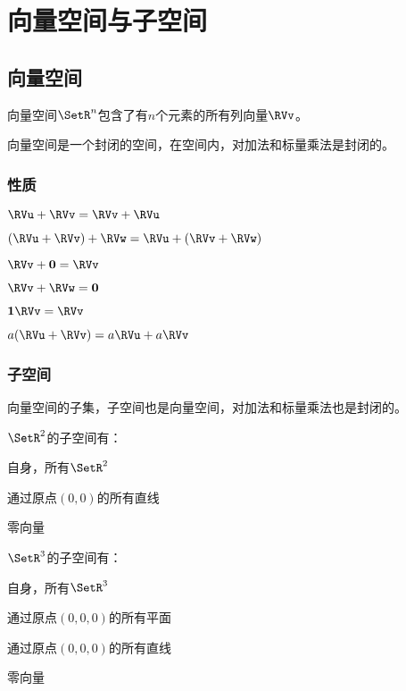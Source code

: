 \chapter{向量空间与子空间}

\section{向量空间}


向量空间$\SetR^{n}$包含了有$n$个元素的所有列向量$\RVv$。

向量空间是一个封闭的空间，在空间内，对加法和标量乘法是封闭的。

\subsection{性质}

\begin{ul}
  \item {} $\RVu + \RVv  = \RVv + \RVu$
  \item {} $(\RVu+\RVv)+\RVw = \RVu + (\RVv+\RVw)$
  \item {} $\RVv+\mathbf{0}=\RVv$
  \item {} $\RVv + \RVw = \mathbf{0}$
  \item {} $\mathbf{1}\RVv=\RVv$
  \item {} $a(\RVu+\RVv) = a\RVu+a\RVv$
\end{ul}

\subsection{子空间}

向量空间的子集，子空间也是向量空间，对加法和标量乘法也是封闭的。


$\SetR^{2}$的子空间有：

\begin{ol}
  \item 自身，所有$\SetR^{2}$
  \item 通过原点$(0,0)$的所有直线
  \item 零向量
\end{ol}

$\SetR^{3}$的子空间有：

\begin{ol}
  \item 自身，所有$\SetR^{3}$
  \item 通过原点$(0,0,0)$的所有平面
  \item 通过原点$(0,0,0)$的所有直线
  \item 零向量
\end{ol}

